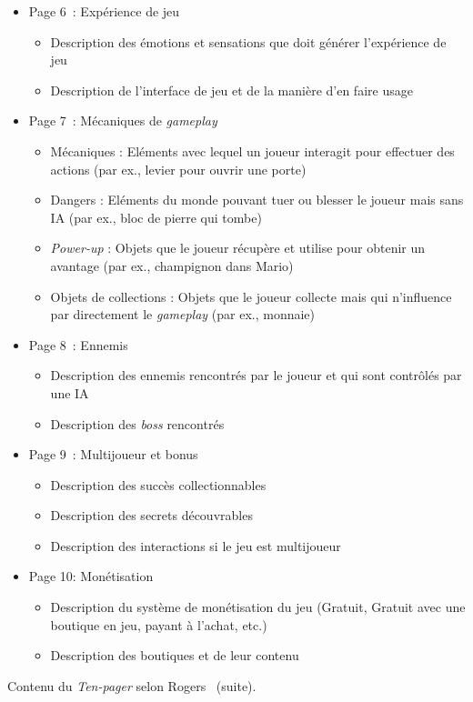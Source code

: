 \begin{table}[H]
\footnotesize
\begin{framed}
\begin{itemize}
    \item Page 6~: Expérience de jeu
    \begin{itemize}
        \item Description des émotions et sensations que doit générer l'expérience de jeu
        \item Description de l'interface de jeu et de la manière d'en faire usage


    \end{itemize}
    \item Page 7~:  Mécaniques de \emph{gameplay}
    \begin{itemize}
        \item Mécaniques : Eléments avec lequel un joueur interagit pour effectuer des actions (par ex., levier pour ouvrir une porte)
        \item Dangers : Eléments du monde pouvant tuer ou blesser le joueur mais sans IA (par ex., bloc de pierre qui tombe)
        \item \emph{Power-up} : Objets que le joueur récupère et utilise pour obtenir un avantage (par ex., champignon dans Mario)
        \item Objets de collections : Objets que le joueur collecte mais qui n'influence par directement le \emph{gameplay} (par ex.,  monnaie)
    \end{itemize}
    \item Page 8~: Ennemis
    \begin{itemize}
        \item Description des ennemis rencontrés par le joueur et qui sont contrôlés par une IA
        \item Description des \emph{boss} rencontrés
    \end{itemize}
    \item Page 9~: Multijoueur et bonus
    \begin{itemize}
        \item Description des succès collectionnables
        \item Description des secrets découvrables
        \item Description des interactions si le jeu est multijoueur
    \end{itemize}
    \item Page 10: Monétisation
    \begin{itemize}
        \item Description du système de monétisation du jeu (Gratuit, Gratuit avec une boutique en jeu, payant à l'achat, etc.)
        \item Description des boutiques et de leur contenu
    \end{itemize}
\end{itemize}
\end{framed}
\caption{Contenu du \emph{Ten-pager} selon Rogers~\cite{LevelUpRogers2014} (suite).}
\label{ten-pager.table}
\end{table}




